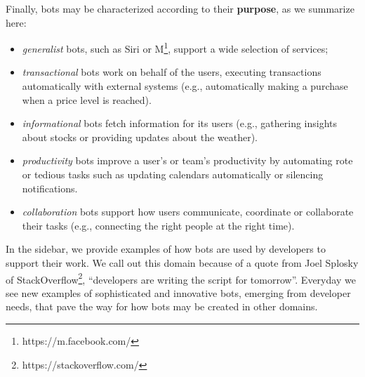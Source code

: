 \documentclass{sig-alternate}
\newcommand{\cl}[1]{\textcolor{blue}{{\it [Carly says: #1]}}}
\begin{document}
Finally, bots may be characterized according to their \textbf{purpose}, as we summarize here: 
\begin{itemize}
\item \emph{generalist} bots, such as Siri or M\footnote{https://m.facebook.com/}, support a wide selection of services; 
\item \emph{transactional} bots work on behalf of the users, executing transactions automatically with external systems (e.g., automatically making a purchase when a price level is reached).  
\item \emph{informational} bots fetch information for its users (e.g., gathering insights about stocks or providing updates about the weather).  
\item \emph{productivity} bots improve a user's or team's productivity by automating rote or tedious tasks such as updating calendars automatically or silencing notifications. 
\item \emph{collaboration} bots support how users communicate, coordinate or collaborate their tasks (e.g., connecting the right people at the right time).
\end{itemize}

In the sidebar, we provide examples of how bots are used by developers to support their work. 
We call out this domain because of a quote from Joel Splosky of StackOverflow\footnote{https://stackoverflow.com/\label{StackOverflow}}, ``developers are writing the script for tomorrow''. Everyday we see new examples of sophisticated and innovative bots, emerging from developer needs, that pave the way for how bots may be created in other domains.
	
\end{document}
